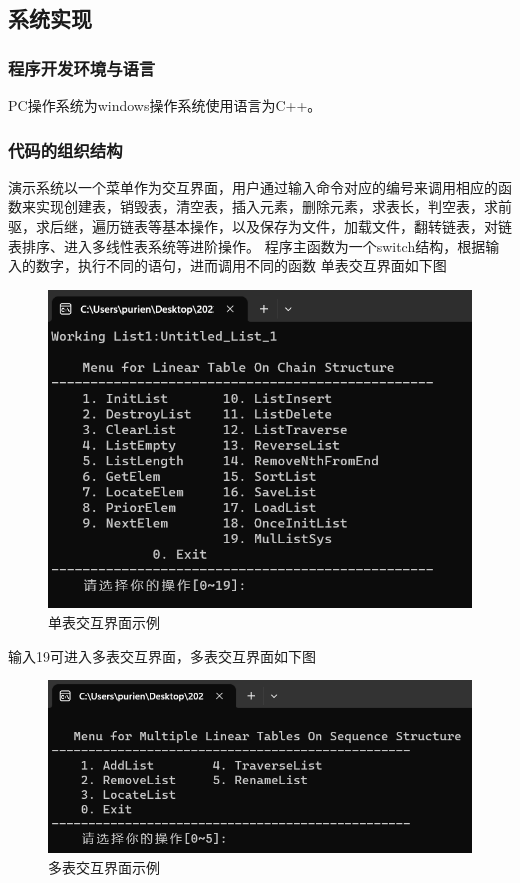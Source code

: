 \documentclass[supercite]{Experimental_Report}
\theoremstyle{definition}
\begin{document}
\subsection{系统实现}
\subsubsection{程序开发环境与语言}
PC操作系统为windows操作系统使用语言为C++。
\subsubsection{代码的组织结构}
演示系统以一个菜单作为交互界面，用户通过输入命令对应的编号来调用相应的函数来实现创建表，销毁表，清空表，插入元素，删除元素，求表长，判空表，求前驱，求后继，遍历链表等基本操作，以及保存为文件，加载文件，翻转链表，对链表排序、进入多线性表系统等进阶操作。
程序主函数为一个switch结构，根据输入的数字，执行不同的语句，进而调用不同的函数
单表交互界面如下图
\begin{figure}[H] %
	\begin{center}
		\includegraphics[width=0.7\linewidth]{images/1.3.1.png}
		\caption{单表交互界面示例}
	\end{center}
\end{figure}
输入19可进入多表交互界面，多表交互界面如下图
\begin{figure}[H] %
	\begin{center}
		\includegraphics[width=0.7\linewidth]{images/1.3.2.png}
		\caption{多表交互界面示例}
	\end{center}
\end{figure}
\end{document}
